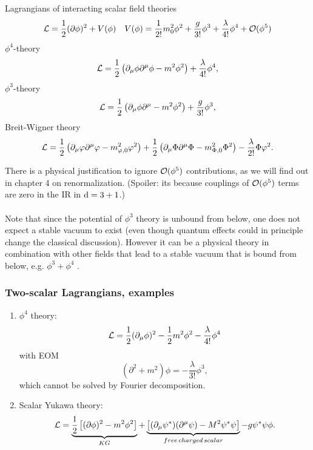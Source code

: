 \begin{mybox}{Lagrangians of interacting scalar field theories}
	\begin{equation}
		\mathcal{L} = \frac{1}{2} (\partial \phi)^2 + V(\phi) \quad V(\phi) = \frac{1}{2 !} m^2_0 \phi^2+ \frac{g}{3!} \phi^3+\frac{\lambda}{4!} \phi^4 + \mathcal{O}(\phi^5)
	\end{equation}
	$\phi^4$-theory
	\begin{equation}
		\label{eq:lagrangianphi4}
		\mathcal{L} = \frac{1}{2} \left(\partial_\mu \phi \partial^\mu \phi - m^2 \phi^2\right) + \frac{\lambda}{4!} \phi^4,
			\end{equation}
	$\phi^3$-theory
	\begin{equation}
		\label{eq:lagrangianphi3}
		\mathcal{L} = \frac{1}{2} \left(\partial_\mu \phi \partial^\mu - m^2 \phi^2\right) + \frac{g}{3!} \phi^3,
	\end{equation}
	Breit-Wigner theory
	\begin{equation}
		\label{eq:lagrangianBreitWigner}
		\mathcal{L} = \frac{1}{2} \left(\partial_\mu \varphi \partial^\mu \varphi - m^2_{\varphi,0} \varphi^2\right) + \frac{1}{2} \left(\partial_\mu \Phi \partial^\mu \Phi-m^2_{\Phi,0} \Phi^2\right) - \frac{\lambda}{2!}\Phi \varphi^2.
	\end{equation}
\end{mybox}
There is a physical justification to ignore $\mathcal{O}(\phi^5)$ contributions, as we will find out in chapter
4 on renormalization. (Spoiler: its because couplings of $\mathcal{O}(\phi^5)$ terms are zero in the IR in $\mathrm{d} = 3+1$.)\\
\\
Note that since the potential of $\phi^3$ theory is unbound from below, one does not expect a stable
vacuum to exist (even though quantum effects could in principle change the classical discussion).
However it can be a physical theory in combination with other fields that lead to a stable vacuum
that is bound from below, e.g. $\phi^3+\phi^4$ .




\subsubsection{Two-scalar Lagrangians, examples}
\begin{enumerate}
	\item $\phi^4$ theory:
\begin{equation}
	\mathcal{L} = \frac{1}{2} (\partial_\mu \phi)^2 -\frac{1}{2} m^2 \phi^2 - \frac{\lambda}{4!}\phi^4
\end{equation}
with EOM
\begin{equation}
	(\partial^2 + m^2) \phi = - \frac{\lambda}{3!} \phi^3,
\end{equation}
which cannot be solved by Fourier decomposition.\\
\item Scalar Yukawa theory:
\begin{equation}
	\mathcal{L} = \underbrace{\frac{1}{2} \left[(\partial \phi)^2 - m^2 \phi^2\right]}_{KG}+\underbrace{\left[(\partial_\mu \psi^*)(\partial^\mu \psi) - M^2 \psi^*\psi\right]}_{free\,charged\,scalar}  -g  \psi^* \psi \phi.
\end{equation}
\end{enumerate}
